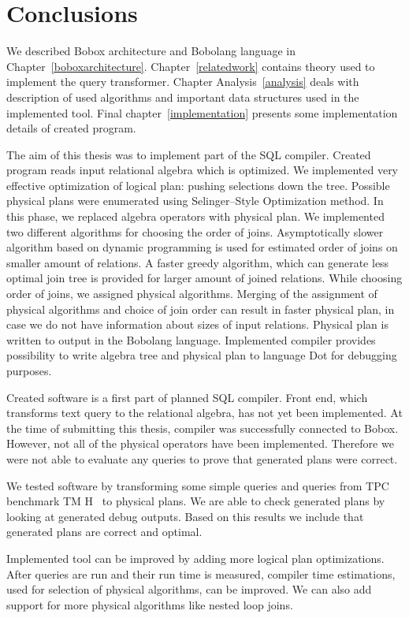 \chapter{Conclusions}

We described Bobox architecture and Bobolang language in Chapter~\ref{boboxarchitecture}. Chapter~\ref{relatedwork} contains theory used to implement the query transformer. Chapter Analysis~\ref{analysis} deals with description of used algorithms and important data structures used in the implemented tool. Final chapter~\ref{implementation} presents some implementation details of created program.

The aim of this thesis was to implement part of the SQL compiler. Created program reads input relational algebra which is optimized. We implemented very effective optimization of logical plan: pushing selections down the tree. Possible physical plans were enumerated using Selinger--Style Optimization method. In this phase, we replaced algebra operators with physical plan. We implemented two different algorithms for choosing the order of joins. Asymptotically slower algorithm based on dynamic programming is used for estimated order of joins on smaller amount of relations. 
A faster greedy algorithm, which can generate less optimal join tree is provided for larger amount of joined relations. While choosing order of joins, we assigned physical algorithms. Merging of the assignment of physical algorithms and choice of join order can result in faster physical plan, in case we do not have information about sizes of input relations. Physical plan is written to output in the Bobolang language. Implemented compiler provides possibility to write algebra tree and physical plan to language Dot for debugging purposes.


Created software is a first part of planned SQL compiler. Front end, which transforms text query to the relational algebra, has not yet been implemented. At the time of submitting this thesis, compiler was successfully connected to Bobox. However, not all of the physical operators have been implemented. Therefore we were not able to evaluate any queries to prove that generated plans were correct.

We tested software by transforming some simple queries and queries from TPC benchmark TM H~\cite{benchmark} to physical plans. We are able to check generated plans by looking at generated debug outputs. Based on this results we include that generated plans are correct and optimal. 

Implemented tool can be improved by adding more logical plan optimizations.
After queries are run and their run time is measured, compiler time estimations, used for selection of physical algorithms, can be improved. 
We can also add support for more physical algorithms like nested loop joins.

